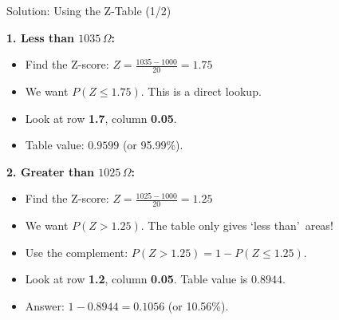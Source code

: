 \begin{frame}{Solution: Using the Z-Table (1/2)}
    \begin{solution}
        \textbf{1. Less than $1035\,\Omega$:}
        \begin{itemize}
            \item Find the Z-score: $Z = \frac{1035 - 1000}{20} = 1.75$
            \item We want $P(Z \leq 1.75)$. This is a direct lookup.
            \item Look at row \textbf{1.7}, column \textbf{0.05}.
            \item Table value: $\mathbf{0.9599}$ (or 95.99\%).
        \end{itemize}
        
        \pause \vspace{0.3cm}
        \textbf{2. Greater than $1025\,\Omega$:}
        \begin{itemize}
            \item Find the Z-score: $Z = \frac{1025 - 1000}{20} = 1.25$
            \item We want $P(Z > 1.25)$. The table only gives \lq less than\rq\ areas!
            \item Use the complement: $P(Z > 1.25) = 1 - P(Z \leq 1.25)$.
            \item Look at row \textbf{1.2}, column \textbf{0.05}. Table value is $0.8944$.
            \item Answer: $1 - 0.8944 = \mathbf{0.1056}$ (or 10.56\%).
        \end{itemize}
    \end{solution}
\end{frame}

